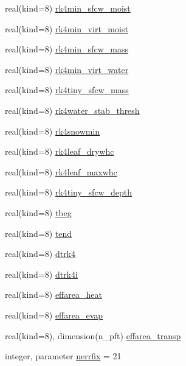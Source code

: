 \begin{DoxyCompactItemize}
real(kind=8) \hyperlink{namespacerk4__coms_a6a0da8f33fe6255b50d37269cc4c5696}{rk4min\+\_\+sfcw\+\_\+moist}
\item 
real(kind=8) \hyperlink{namespacerk4__coms_a7de60af9cd3a8a43651da0ed30f0d878}{rk4min\+\_\+virt\+\_\+moist}
\item 
real(kind=8) \hyperlink{namespacerk4__coms_a59856872bd14cf839fe440bfe839560f}{rk4min\+\_\+sfcw\+\_\+mass}
\item 
real(kind=8) \hyperlink{namespacerk4__coms_a06cc5f6b7afaa313576b32bc56bf80d9}{rk4min\+\_\+virt\+\_\+water}
\item 
real(kind=8) \hyperlink{namespacerk4__coms_a546ef5b5ec1d1def51dcae82893eb2bc}{rk4tiny\+\_\+sfcw\+\_\+mass}
\item 
real(kind=8) \hyperlink{namespacerk4__coms_a9a7486e4755f548d744d266af9052d4f}{rk4water\+\_\+stab\+\_\+thresh}
\item 
real(kind=8) \hyperlink{namespacerk4__coms_a8d12416210875d4e246328901524e941}{rk4snowmin}
\item 
real(kind=8) \hyperlink{namespacerk4__coms_a3f7465768e9a9783cb2c7633da03acd6}{rk4leaf\+\_\+drywhc}
\item 
real(kind=8) \hyperlink{namespacerk4__coms_ac35950b114c389050144c9293d9a4e8a}{rk4leaf\+\_\+maxwhc}
\item 
real(kind=8) \hyperlink{namespacerk4__coms_a91e4907e16271a89cb5b965a061e20e2}{rk4tiny\+\_\+sfcw\+\_\+depth}
\item 
real(kind=8) \hyperlink{namespacerk4__coms_a9b09c4fc7f09c642c1115df229cedb1e}{tbeg}
\item 
real(kind=8) \hyperlink{namespacerk4__coms_a489d1f63edd639eb7a5c248163b59f9b}{tend}
\item 
real(kind=8) \hyperlink{namespacerk4__coms_affa4e03ec127e7def8035b8b32bdb5b8}{dtrk4}
\item 
real(kind=8) \hyperlink{namespacerk4__coms_a987c7ccf90cfcf40c2a925b2c1057404}{dtrk4i}
\item 
real(kind=8) \hyperlink{namespacerk4__coms_af575cfc8fb0e2063e1d3a08be26aea3a}{effarea\+\_\+heat}
\item 
real(kind=8) \hyperlink{namespacerk4__coms_aae531dd6ba4cf10a03c3fad2b61071bb}{effarea\+\_\+evap}
\item 
real(kind=8), dimension(n\+\_\+pft) \hyperlink{namespacerk4__coms_aa9b9a7fcec09aad8a6d3423c30c3b1de}{effarea\+\_\+transp}
\item 
integer, parameter \hyperlink{namespacerk4__coms_a8f0596202fc6dc04e70e600a544ae155}{nerrfix} = 21
\item 

\end{DoxyCompactItemize}
